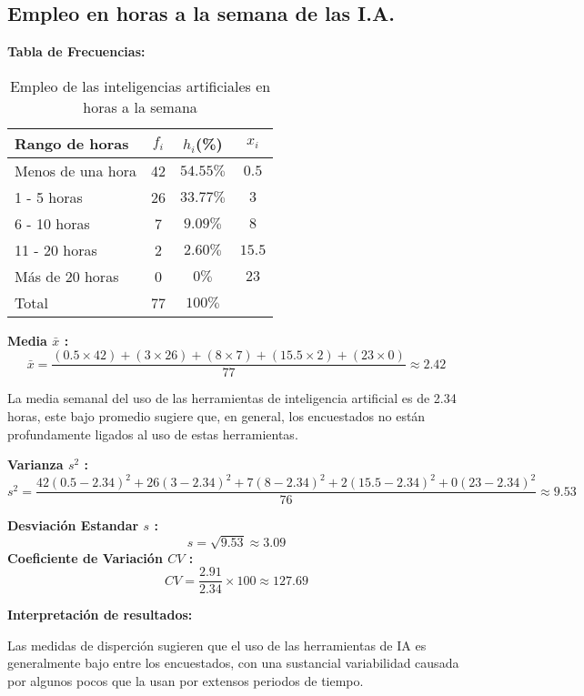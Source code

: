 \subsection{Empleo en horas a la semana de las I.A.}
\textbf{Tabla de Frecuencias:} \\

\begin{table}[h!]
	\centering
	\renewcommand{\arraystretch}{1.5} 
	\begin{tabular}{l c c c }
		\hline
		{Rango de horas} & {\(f_i\)} & \textit{\(h_i\)}(\%) & \textit{\(x_i\)}\\
		\hline
		Menos de una hora	& 42 & \(54.55\%\) & \(0.5\)	\\
		1 - 5 horas			& 26 & \(33.77\%\) & \(3\)		\\
		6 - 10 horas 		& 7  & \(9.09\%\)  & \(8\)		\\
		11 - 20 horas 		& 2  & \(2.60\%\)  & \(15.5\)	\\
		Más de 20 horas		& 0  & \(0\%\)     & \(23\)		\\
		\hline
		Total				& 77 & \(100\%\) \\
		\hline
	\end{tabular}
	\caption{Empleo de las inteligencias artificiales en horas a la semana}
	\label{tabla:EmpleoEnHoras}
\end{table}

\textbf{Media $\bar{x}$ :}
\begin{equation*}
	\bar{x} = \dfrac{(0.5 \times 42) + (3 \times 26) + (8 \times 7) + (15.5 \times 2) + (23 \times 0)}{77} \approx 2.42
\end{equation*}

La media semanal del uso de las herramientas de inteligencia artificial es de 2.34 horas, este bajo promedio sugiere que, en general, los encuestados no están profundamente ligados al uso de estas herramientas.

\textbf{Varianza $s^2$ :}
\begin{equation*}
	s^2 = \dfrac{42(0.5 - 2.34)^2 + 26(3 - 2.34)^2 + 7(8 - 2.34)^2 + 2(15.5 - 2.34)^2 + 0(23 - 2.34)^2}{76} \approx 9.53
\end{equation*}

\begin{multicols}{2}
	\textbf{Desviación Estandar $s$ :}
	\begin{equation*}
		s = \sqrt{9.53} \approx 3.09
	\end{equation*}
	\textbf{Coeficiente de Variación $CV$ :}
	\begin{equation*}
		CV = \dfrac{2.91}{2.34} \times 100 \approx 127.69
	\end{equation*}  
\end{multicols}

\textbf{Interpretación de resultados:}

Las medidas de disperción sugieren que el uso de las herramientas de IA es generalmente bajo entre los encuestados, con una sustancial variabilidad causada por algunos pocos que la usan por extensos periodos de tiempo.